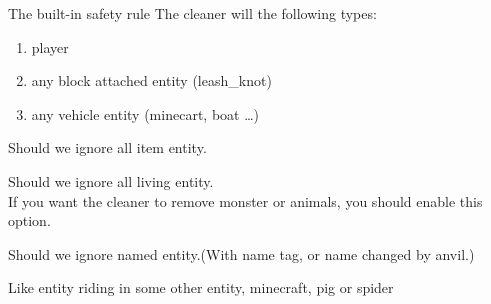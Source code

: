\begin{samepage}
    \begin{note}{The built-in safety rule}
        The cleaner will  the following types:
        \begin{enumerate}
            \item player
            \item any block attached entity (\eg leash\_knot)
            \item any vehicle entity (\eg minecart, boat \ldots)
        \end{enumerate}
    \end{note}
\end{samepage}

Should we ignore all item entity.

Should we ignore all living entity.\\
If you want the cleaner to remove monster or animals, you should enable this option.

Should we ignore named entity.(With name tag, or name changed by anvil.)

Like entity riding in some other entity, \eg minecraft, pig or spider



